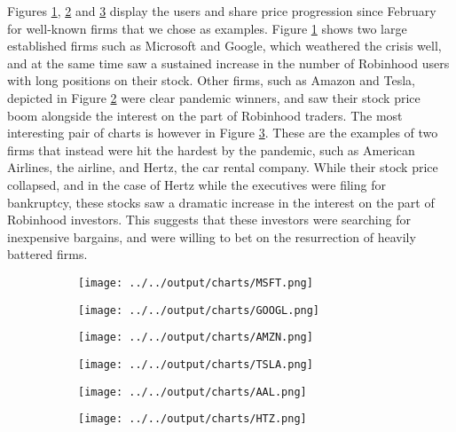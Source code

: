 \documentclass[12pt]{article}
\numberwithin{equation}{section} %
\begin{document}
Figures \ref{chart-established}, \ref{chart-winners} and \ref{chart-dead} display the users and share price progression since February for well-known firms that we chose as examples. Figure \ref{chart-established} shows two large established firms such as Microsoft and Google, which weathered the crisis well, and at the same time saw a sustained increase in the number of Robinhood users with long positions on their stock. Other firms, such as Amazon and Tesla, depicted in Figure \ref{chart-winners} were clear pandemic winners, and saw their stock price boom alongside the interest on the part of Robinhood traders. The most interesting pair of charts is however in Figure \ref{chart-dead}. These are the examples of two firms that instead were hit the hardest by the pandemic, such as American Airlines, the airline, and Hertz, the car rental company. While their stock price collapsed, and in the case of Hertz while the executives were filing for bankruptcy, these stocks saw a dramatic increase in the interest on the part of Robinhood investors. This suggests that these investors were searching for inexpensive bargains, and were willing to bet on the resurrection of heavily battered firms.



\begin{figure}
\centering
\caption{Test}
\begin{subfigure}{.5\textwidth}
\centering
\texttt{[image: ../../output/charts/MSFT.png]} 
\end{subfigure}%
\begin{subfigure}{.5\textwidth}
\centering
\texttt{[image: ../../output/charts/GOOGL.png]}
\end{subfigure}
\label{chart-established}
\end{figure}

\begin{figure}
\centering
\caption{Test}
\begin{subfigure}{.5\textwidth}
\centering
\texttt{[image: ../../output/charts/AMZN.png]} 
\end{subfigure}%
\begin{subfigure}{.5\textwidth}
\centering
\texttt{[image: ../../output/charts/TSLA.png]}
\end{subfigure}
\label{chart-winners}
\end{figure}

\begin{figure}
\centering
\caption{Test}
\begin{subfigure}{.5\textwidth}
\centering
\texttt{[image: ../../output/charts/AAL.png]} 
\end{subfigure}%
\begin{subfigure}{.5\textwidth}
\centering
\texttt{[image: ../../output/charts/HTZ.png]}
\end{subfigure}
\label{chart-dead}
\end{figure}
\end{document}
